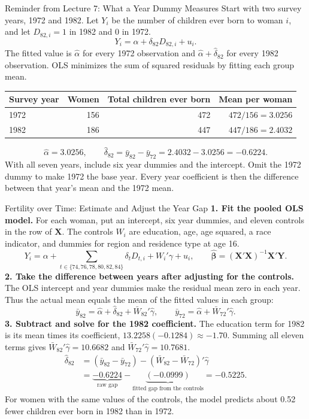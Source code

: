 \documentclass[notes,10pt, aspectratio=169]{beamer}
\begin{document}
\begin{frame}{Reminder from Lecture 7: What a Year Dummy Measures}
\small
Start with two survey years, 1972 and 1982. Let $Y_i$ be the number of children ever born to woman $i$, and let $D_{82,i}=1$ in 1982 and $0$ in 1972.
\[
Y_i=\alpha+\delta_{82}D_{82,i}+u_i.
\]
The fitted value is $\hat\alpha$ for every 1972 observation and $\hat\alpha+\hat\delta_{82}$ for every 1982 observation. OLS minimizes the sum of squared residuals by fitting each group mean.
\begin{center}
\begin{tabular}{lrrr}
\toprule
Survey year & Women & Total children ever born & Mean per woman\\
\midrule
1972 & 156 & 472 & $472/156=3.0256$\\
1982 & 186 & 447 & $447/186=2.4032$\\
\bottomrule
\end{tabular}
\end{center}
\[
\hat\alpha=3.0256,\qquad
\hat\delta_{82}=\bar y_{82}-\bar y_{72}=2.4032-3.0256=-0.6224.
\]
With all seven years, include six year dummies and the intercept. Omit the 1972 dummy to make 1972 the base year. Every year coefficient is then the difference between that year's mean and the 1972 mean.
\end{frame}

\begin{frame}{Fertility over Time: Estimate and Adjust the Year Gap}
\small
\setlength{\abovedisplayskip}{5pt}
\setlength{\belowdisplayskip}{5pt}
\textbf{1. Fit the pooled OLS model.} For each woman, put an intercept, six year dummies, and eleven controls in the row of $\mathbf X$. The controls $W_i$ are education, age, age squared, a race indicator, and dummies for region and residence type at age 16.
\[
Y_i=\alpha+\sum_{t\in\{74,76,78,80,82,84\}}\delta_t D_{t,i}+W_i'\gamma+u_i,
\qquad
\hat{\boldsymbol\beta}=(\mathbf X'\mathbf X)^{-1}\mathbf X'\mathbf Y .
\]
\textbf{2. Take the difference between years after adjusting for the controls.}
The OLS intercept and year dummies make the residual mean zero in each year.
Thus the actual mean equals the mean of the fitted values in each group:
\[
\bar y_{82}=\hat\alpha+\hat\delta_{82}+\bar W_{82}'\hat\gamma,
\qquad
\bar y_{72}=\hat\alpha+\bar W_{72}'\hat\gamma.
\]
\textbf{3. Subtract and solve for the 1982 coefficient.} The education term for 1982 is its mean times its coefficient, $13.2258(-0.1284)\approx-1.70$. Summing all eleven terms gives $\bar W_{82}'\hat\gamma=10.6682$ and $\bar W_{72}'\hat\gamma=10.7681$.
\[
\begin{aligned}
\hat\delta_{82}
&=(\bar y_{82}-\bar y_{72})-(\bar W_{82}-\bar W_{72})'\hat\gamma\\
&=\underbrace{-0.6224}_{\text{raw gap}}
  -\underbrace{(-0.0999)}_{\text{fitted gap from the controls}}
  =\boxed{-0.5225}.
\end{aligned}
\]
For women with the same values of the controls, the model predicts about 0.52 fewer children ever born in 1982 than in 1972.
\end{frame}
\end{document}
